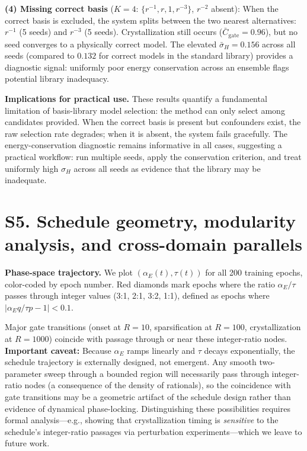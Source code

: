 \documentclass[aps,pre,reprint,superscriptaddress]{revtex4-2}
\begin{document}
\textbf{(4) Missing correct basis} ($K=4$: $\{r^{-1}, r, 1, r^{-3}\}$, $r^{-2}$ absent): When the correct basis is excluded, the system splits between the two nearest alternatives: $r^{-1}$ (5 seeds) and $r^{-3}$ (5 seeds). Crystallization still occurs ($\bar{C}_{\mathrm{gate}} = 0.96$), but no seed converges to a physically correct model. The elevated $\bar{\sigma}_H = 0.156$ across all seeds (compared to $0.132$ for correct models in the standard library) provides a diagnostic signal: uniformly poor energy conservation across an ensemble flags potential library inadequacy.

\textbf{Implications for practical use.} These results quantify a fundamental limitation of basis-library model selection: the method can only select among candidates provided. When the correct basis is present but confounders exist, the raw selection rate degrades; when it is absent, the system fails gracefully. The energy-conservation diagnostic remains informative in all cases, suggesting a practical workflow: run multiple seeds, apply the conservation criterion, and treat uniformly high $\sigma_H$ across all seeds as evidence that the library may be inadequate.

\section{S5. Schedule geometry, modularity analysis, and cross-domain parallels}
\textbf{Phase-space trajectory.} We plot $(\alpha_E(t), \tau(t))$ for all 200 training epochs, color-coded by epoch number. Red diamonds mark epochs where the ratio $\alpha_E / \tau$ passes through integer values (3:1, 2:1, 3:2, 1:1), defined as epochs where $|\alpha_E q / \tau p - 1| < 0.1$.

Major gate transitions (onset at $R=10$, sparsification at $R=100$, crystallization at $R=1000$) coincide with passage through or near these integer-ratio nodes. \textbf{Important caveat:} Because $\alpha_E$ ramps linearly and $\tau$ decays exponentially, the schedule trajectory is externally designed, not emergent. Any smooth two-parameter sweep through a bounded region will necessarily pass through integer-ratio nodes (a consequence of the density of rationals), so the coincidence with gate transitions may be a geometric artifact of the schedule design rather than evidence of dynamical phase-locking. Distinguishing these possibilities requires formal analysis---e.g., showing that crystallization timing is \textit{sensitive} to the schedule's integer-ratio passages via perturbation experiments---which we leave to future work.
\end{document}
